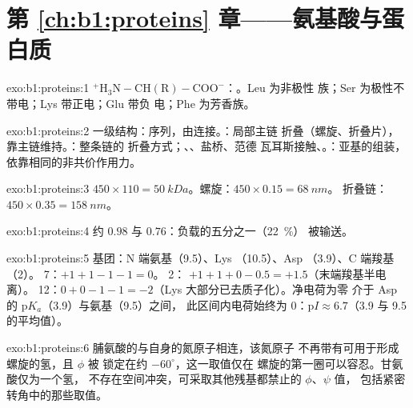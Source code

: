 \section*{第 \ref{ch:b1:proteins} 章——氨基酸与蛋白质}

\begin{solution}{exo:b1:proteins:1}
$\mathrm{^+H_3N{-}CH(R){-}COO^-}$：。Leu 为非极性
族；Ser 为极性不带电；Lys 带正电；Glu 带负
电；Phe 为芳香族。
\end{solution}

\begin{solution}{exo:b1:proteins:2}
一级结构：序列，由连接。：局部主链
折叠（螺旋、折叠片），靠主链维持。：整条链的
折叠方式；、、盐桥、范德
瓦耳斯接触、。：亚基的组装，
依靠相同的非共价作用力。
\end{solution}

\begin{solution}{exo:b1:proteins:3}
$450\times 110 = \qty{50}{kDa}$。螺旋：$450\times 0.15 = \qty{68}{nm}$。
折叠链：$450\times 0.35 = \qty{158}{nm}$。
\end{solution}

\begin{solution}{exo:b1:proteins:4}
约 $0.98$ 与 $0.76$：负载的五分之一（\qty{22}{\%}）
被输送。
\end{solution}

\begin{solution}{exo:b1:proteins:5}
基团：N 端氨基（9.5）、Lys （10.5）、Asp 
（3.9）、C 端羧基（2）。 7：$+1 + 1 - 1 - 1 = 0$。 2：
$+1 + 1 + 0 - 0.5 = +1.5$（末端羧基半电离）。
12：$0 + 0 - 1 - 1 = -2$（Lys 大部分已去质子化）。净电荷为零
介于 Asp 的 p$K_a$（3.9）与氨基（9.5）之间，
此区间内电荷始终为 $0$：p$I \approx 6.7$（3.9 与 9.5 的平均值）。
\end{solution}

\begin{solution}{exo:b1:proteins:6}
脯氨酸的与自身的氮原子相连，该氮原子
不再带有可用于形成螺旋的氢，且 $\phi$ 被
锁定在约 $-60^\circ$，这一取值仅在
螺旋的第一圈可以容忍。甘氨酸仅为一个氢，
不存在空间冲突，可采取其他残基都禁止的 $\phi$、$\psi$ 值，
包括紧密转角中的那些取值。
\end{solution}

